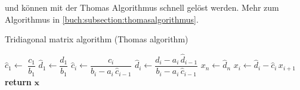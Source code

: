   und k\"onnen mit der Thomas Algorithmus schnell gel\"ost werden.
   Mehr zum Algorithmus in \ref{buch:subsection:thomasalgorithmus}.

\begin{algorithm}\caption{Tridiagonal matrix algorithm (Thomas algorithm)}\label{TDMA}
  \setlength{\lineskip}{7pt}
  \begin{algorithmic}[1]
      \State $\hat c_1 \gets$ $ \dfrac{c_1}{b_1}$
      \State $\hat d_1 \gets \dfrac{d_1}{b_1}$
        \State $\hat c_i \gets \dfrac{c_i}{b_i-a_i \, \hat c_{i-1}}$
        \State $\hat d_i \gets \dfrac{d_i - a_i \, \hat d_{i-1}}{b_i-a_i \, \hat c_{i-1}}$
      \EndFor
      \State $x_n \gets \hat d_n$
        \State $x_i \gets \hat d_i - \hat c_i \, x_{i+1}$
      \EndFor
      \State \textbf{return} $\textbf{x}$
    \EndFunction
  \end{algorithmic}
\end{algorithm}


